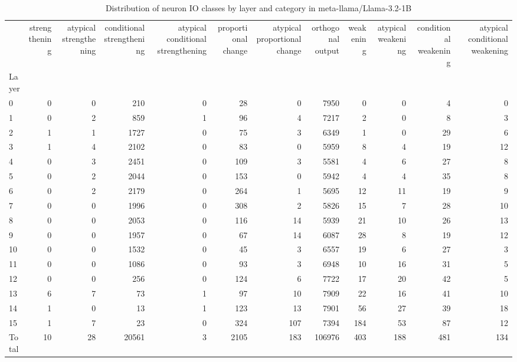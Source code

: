 \begin{table}
\caption{Distribution of neuron IO classes by layer and category in meta-llama/Llama-3.2-1B}
\label{tab:meta-llama/Llama-3.2-1B}
\begin{tabular}{lrrrrrrrrrrr}
 & strengthening & atypical strengthening & conditional strengthening & atypical conditional strengthening & proportional change & atypical proportional change & orthogonal output & weakening & atypical weakening & conditional weakening & atypical conditional weakening \\
Layer &  &  &  &  &  &  &  &  &  &  &  \\
0 & 0 & 0 & 210 & 0 & 28 & 0 & 7950 & 0 & 0 & 4 & 0 \\
1 & 0 & 2 & 859 & 1 & 96 & 4 & 7217 & 2 & 0 & 8 & 3 \\
2 & 1 & 1 & 1727 & 0 & 75 & 3 & 6349 & 1 & 0 & 29 & 6 \\
3 & 1 & 4 & 2102 & 0 & 83 & 0 & 5959 & 8 & 4 & 19 & 12 \\
4 & 0 & 3 & 2451 & 0 & 109 & 3 & 5581 & 4 & 6 & 27 & 8 \\
5 & 0 & 2 & 2044 & 0 & 153 & 0 & 5942 & 4 & 4 & 35 & 8 \\
6 & 0 & 2 & 2179 & 0 & 264 & 1 & 5695 & 12 & 11 & 19 & 9 \\
7 & 0 & 0 & 1996 & 0 & 308 & 2 & 5826 & 15 & 7 & 28 & 10 \\
8 & 0 & 0 & 2053 & 0 & 116 & 14 & 5939 & 21 & 10 & 26 & 13 \\
9 & 0 & 0 & 1957 & 0 & 67 & 14 & 6087 & 28 & 8 & 19 & 12 \\
10 & 0 & 0 & 1532 & 0 & 45 & 3 & 6557 & 19 & 6 & 27 & 3 \\
11 & 0 & 0 & 1086 & 0 & 93 & 3 & 6948 & 10 & 16 & 31 & 5 \\
12 & 0 & 0 & 256 & 0 & 124 & 6 & 7722 & 17 & 20 & 42 & 5 \\
13 & 6 & 7 & 73 & 1 & 97 & 10 & 7909 & 22 & 16 & 41 & 10 \\
14 & 1 & 0 & 13 & 1 & 123 & 13 & 7901 & 56 & 27 & 39 & 18 \\
15 & 1 & 7 & 23 & 0 & 324 & 107 & 7394 & 184 & 53 & 87 & 12 \\
Total & 10 & 28 & 20561 & 3 & 2105 & 183 & 106976 & 403 & 188 & 481 & 134 \\
\end{tabular}
\end{table}
